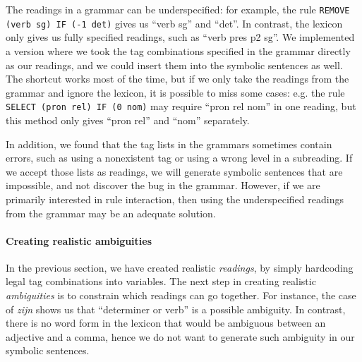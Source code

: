 {{%

The readings in a grammar can be underspecified: for example, the rule
\texttt{REMOVE (verb sg) IF (-1 det)} gives us ``verb sg'' and ``det''.
In contrast, the lexicon only gives us fully specified readings, such
as ``verb pres p2 sg''. We implemented a version where we took
the tag combinations specified in the grammar directly as our
readings, and we could insert them into the symbolic sentences as well.
The shortcut works most of the time, but if we only take the readings
from the grammar and ignore the lexicon, it is possible to
miss some cases: e.g. the rule \texttt{SELECT (pron rel) IF (0 nom)} 
may require ``pron rel nom'' in one reading, but this method only gives
``pron rel'' and ``nom'' separately. 


In addition, we found that the tag lists in the grammars sometimes
contain errors, such as using a nonexistent tag or using a wrong level
in a subreading. If we accept those lists as readings, we will
generate symbolic sentences that are impossible, and not discover
the bug in the grammar.
However, if we are primarily interested in rule interaction, then using
the underspecified readings from the grammar may be an adequate solution.



\paragraph{Creating realistic ambiguities}


In the previous section, we have created realistic \emph{readings}, by simply hardcoding legal tag combinations into variables. The next step in creating realistic \emph{ambiguities} is to constrain which readings can go together. For instance, the case of \emph{zijn} shows us that ``determiner or verb'' is a possible ambiguity. In contrast, there is no word form in the lexicon that would be ambiguous between an adjective and a comma, hence we do not want to generate such ambiguity in our symbolic sentences.

}}
